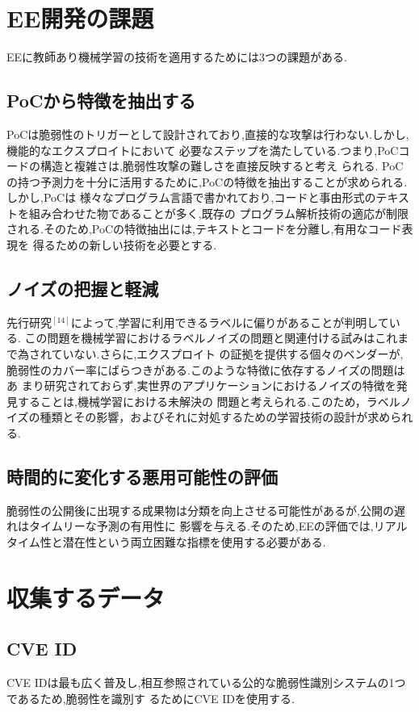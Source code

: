 \documentclass[submit,techreq,noauthor]{eco}	%
\begin{document}
\section{EE開発の課題}
EEに教師あり機械学習の技術を適用するためには3つの課題がある.

\subsection*{PoCから特徴を抽出する}
PoCは脆弱性のトリガーとして設計されており,直接的な攻撃は行わない.しかし,機能的なエクスプロイトにおいて
必要なステップを満たしている.つまり,PoCコードの構造と複雑さは,脆弱性攻撃の難しさを直接反映すると考え
られる. PoCの持つ予測力を十分に活用するために,PoCの特徴を抽出することが求められる.しかし,PoCは
様々なプログラム言語で書かれており,コードと事由形式のテキストを組み合わせた物であることが多く,既存の
プログラム解析技術の適応が制限される.そのため,PoCの特徴抽出には,テキストとコードを分離し,有用なコード表現を
得るための新しい技術を必要とする.

\subsection*{ノイズの把握と軽減}
先行研究\begin{math}^{[14]}\end{math}によって,学習に利用できるラベルに偏りがあることが判明している.
この問題を機械学習におけるラベルノイズの問題と関連付ける試みはこれまで為されていない.さらに,エクスプロイト
の証拠を提供する個々のベンダーが,脆弱性のカバー率にばらつきがある.このような特徴に依存するノイズの問題はあ
まり研究されておらず,実世界のアプリケーションにおけるノイズの特徴を発見することは,機械学習における未解決の
問題と考えられる.このため，ラベルノイズの種類とその影響，およびそれに対処するための学習技術の設計が求められる.

\subsection*{時間的に変化する悪用可能性の評価}
脆弱性の公開後に出現する成果物は分類を向上させる可能性があるが,公開の遅れはタイムリーな予測の有用性に
影響を与える.そのため,EEの評価では,リアルタイム性と潜在性という両立困難な指標を使用する必要がある.

\section{収集するデータ}

\subsection*{CVE ID}
CVE IDは最も広く普及し,相互参照されている公的な脆弱性識別システムの1つであるため,脆弱性を識別す
るためにCVE IDを使用する.
\end{document}
